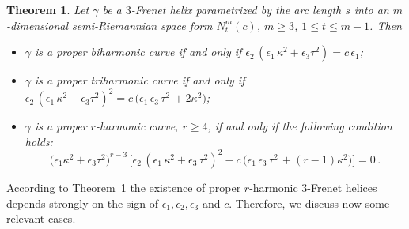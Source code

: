 \documentclass[11pt]{amsart}
\theoremstyle{plain}
\newtheorem{theorem}                {Theorem}      [section]
\theoremstyle{definition}
\numberwithin{equation}{section}
\begin{document}
\begin{theorem}\label{Th-r-harm-cond-3-dim-space-form}
Let $\gamma$ be a $3$-Frenet helix parametrized by the arc length $s$ into an $m$-dimensional semi-Riemannian space form $N^m_t(c)$, $m \geq 3$, $1 \leq t \leq m-1$. Then 
\begin{itemize}
\item[{\rm (i)}] $\gamma$ is a proper biharmonic curve if and only if $\epsilon_2 \, (\epsilon_1 \, \kappa^2 + \epsilon_3 \tau^2) = c \, \epsilon_1$;
\item[{\rm (ii)}] $\gamma$ is a proper triharmonic curve if and only if $\epsilon_2 \, (\epsilon_1 \, \kappa^2 + \epsilon_3 \tau^2 )^2 = c \, \big( \epsilon_1\,\epsilon_3 \, \tau^2\, + 2 \kappa^2 \big)$;
\item[{\rm (iii)}] $\gamma$ is a proper $r$-harmonic curve, $r \geq  4$, if and only if the following condition holds:
\begin{equation}\label{eq-r-harmonicity-spaceforms-r>3}
 \big(\epsilon_1 \kappa^2 + \epsilon_3 \tau^2\big)^{r-3}\,\Big [\epsilon_2 \, (\epsilon_1 \, \kappa^2 + \epsilon_3 \, \tau^2)^2 - c \, \big( \epsilon_1\,\epsilon_3 \, \tau^2\, + (r - 1) \kappa^2 \big )\Big ]=0\,.
\end{equation}
\end{itemize}
\end{theorem}
According to Theorem~\ref{Th-r-harm-cond-3-dim-space-form} the existence of proper $r$-harmonic $3$-Frenet helices depends strongly on the sign of $\epsilon_1,\epsilon_2,\epsilon_3$ and $c$. Therefore, we discuss now some relevant cases. 
\end{document}
